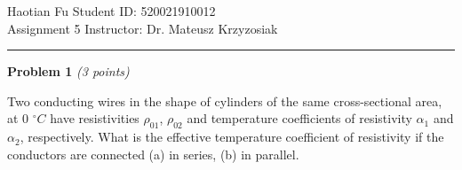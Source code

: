 \documentclass[a4paper, 11pt]{article}
\newenvironment{problem}[3][Problem]
    { \begin{mdframed}[backgroundcolor=gray!20] \textbf{#1 #2} \textit{(#3 points)} }
    {  \end{mdframed}}
\begin{document}
\noindent
\large Haotian Fu \hfill Student ID: 520021910012    \\
Assignment 5 \hfill Instructor: Dr. Mateusz Krzyzosiak \\

\noindent\rule{7.1in}{2.8pt}
\vspace{0.5mm}

\begin{problem}{1}{3}
\par Two conducting wires in the shape of cylinders of the same cross-sectional area, at 0 $^\circ C$ have resistivities $\rho_{01}$, $\rho_{02}$ and temperature coefficients of resistivity $\alpha_1$ and $\alpha_2$, respectively. What is the effective temperature coefficient of resistivity if the conductors are connected (a) in series, (b) in parallel.
\end{problem}
\vspace{3mm}
\end{document}
